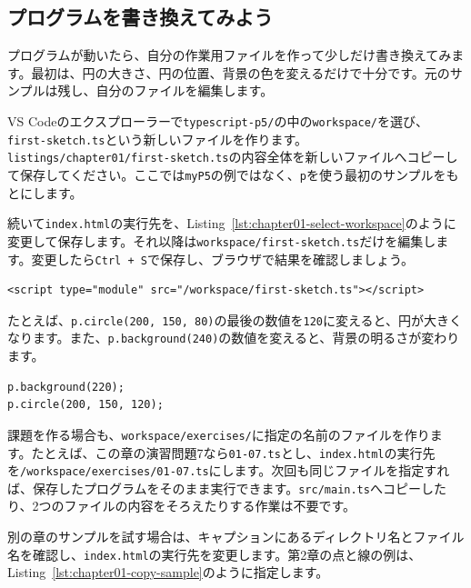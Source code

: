 \subsection{プログラムを書き換えてみよう}

プログラムが動いたら、自分の作業用ファイルを作って少しだけ書き換えてみます。最初は、円の大きさ、円の位置、背景の色を変えるだけで十分です。元のサンプルは残し、自分のファイルを編集します。

VS Codeのエクスプローラーで\texttt{typescript-p5/}の中の\texttt{workspace/}を選び、\texttt{first-sketch.ts}という新しいファイルを作ります。\texttt{listings/chapter01/first-sketch.ts}の内容全体を新しいファイルへコピーして保存してください。ここでは\texttt{myP5}の例ではなく、\texttt{p}を使う最初のサンプルをもとにします。

続いて\texttt{index.html}の実行先を、Listing~\ref{lst:chapter01-select-workspace}のように変更して保存します。それ以降は\texttt{workspace/first-sketch.ts}だけを編集します。変更したら\texttt{Ctrl + S}で保存し、ブラウザで結果を確認しましょう。

\begin{listing}[htbp]
\begin{verbatim}
<script type="module" src="/workspace/first-sketch.ts"></script>
\end{verbatim}
\caption{自分の作業用ファイルを直接実行する}
\label{lst:chapter01-select-workspace}
\end{listing}

たとえば、\texttt{p.circle(200, 150, 80)}の最後の数値を\texttt{120}に変えると、円が大きくなります。また、\texttt{p.background(240)}の数値を変えると、背景の明るさが変わります。

\begin{listing}[htbp]
\begin{verbatim}
p.background(220);
p.circle(200, 150, 120);
\end{verbatim}
\caption{背景と円の大きさを変更する例}
\label{lst:chapter01-edit-circle}
\end{listing}

課題を作る場合も、\texttt{workspace/exercises/}に指定の名前のファイルを作ります。たとえば、この章の演習問題7なら\texttt{01-07.ts}とし、\texttt{index.html}の実行先を\texttt{/workspace/exercises/01-07.ts}にします。次回も同じファイルを指定すれば、保存したプログラムをそのまま実行できます。\texttt{src/main.ts}へコピーしたり、2つのファイルの内容をそろえたりする作業は不要です。

別の章のサンプルを試す場合は、キャプションにあるディレクトリ名とファイル名を確認し、\texttt{index.html}の実行先を変更します。第2章の点と線の例は、Listing~\ref{lst:chapter01-copy-sample}のように指定します。

